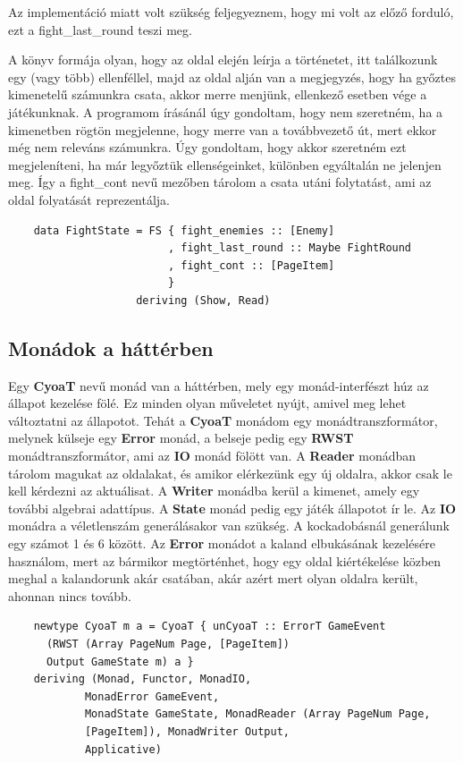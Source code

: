 \documentclass[12pt,a4paper,oneside]{report}
\newcommand{\xstate}[1]{{\color{State}#1}}
\begin{document}
    Az implementáció miatt volt szükség feljegyeznem,
    hogy mi volt az előző forduló, ezt a \xstate{fight\_last\_round} teszi
    meg.

    A könyv formája olyan, hogy az oldal elején leírja a
    történetet, itt találkozunk egy (vagy több) ellenféllel, majd az
    oldal alján van a megjegyzés, hogy ha győztes kimenetelű
    számunkra csata, akkor merre menjünk, ellenkező esetben vége a
    játékunknak. A programom írásánál úgy gondoltam, hogy nem
    szeretném, ha a kimenetben rögtön megjelenne, hogy merre van a
    továbbvezető út, mert ekkor még nem releváns számunkra. Úgy
    gondoltam, hogy akkor szeretném ezt megjeleníteni, ha már
    legyőztük ellenségeinket, különben egyáltalán ne jelenjen
    meg. Így a \xstate{fight\_cont} nevű mezőben tárolom a csata utáni
    folytatást, ami az oldal folyatását reprezentálja.
    \begin{verbatim}
    data FightState = FS { fight_enemies :: [Enemy]
                         , fight_last_round :: Maybe FightRound
                         , fight_cont :: [PageItem]
                         }
                    deriving (Show, Read)
    \end{verbatim}
    
    \subsection{Monádok a háttérben}
    Egy {\bf CyoaT} nevű monád van a háttérben, mely egy monád-interfészt
    húz az állapot kezelése fölé. Ez minden olyan műveletet nyújt,
    amivel meg lehet változtatni az állapotot.  Tehát a {\bf CyoaT} monádom
    egy monádtranszformátor, melynek külseje egy {\bf Error} monád, a
    belseje pedig egy {\bf RWST} monádtranszformátor, ami az {\bf IO} monád fölött
    van. A {\bf Reader} monádban tárolom magukat az oldalakat, és amikor
    elérkezünk egy új oldalra, akkor csak le kell kérdezni az
    aktuálisat. A {\bf Writer} monádba kerül a kimenet, amely egy további
    algebrai adattípus. A {\bf State} monád pedig egy játék állapotot ír le.
    Az {\bf IO} monádra a véletlenszám generálásakor van szükség. A
    kockadobásnál generálunk egy számot 1 és 6 között. Az {\bf Error}
    monádot a kaland elbukásának kezelésére használom, mert az bármikor
    megtörténhet, hogy egy oldal kiértékelése közben meghal a kalandorunk
    akár csatában, akár azért mert olyan oldalra került, ahonnan nincs
    tovább.
    \begin{verbatim}
    newtype CyoaT m a = CyoaT { unCyoaT :: ErrorT GameEvent
      (RWST (Array PageNum Page, [PageItem])
      Output GameState m) a }
    deriving (Monad, Functor, MonadIO,
            MonadError GameEvent,
            MonadState GameState, MonadReader (Array PageNum Page,
            [PageItem]), MonadWriter Output,
            Applicative)
    \end{verbatim}
\end{document}
